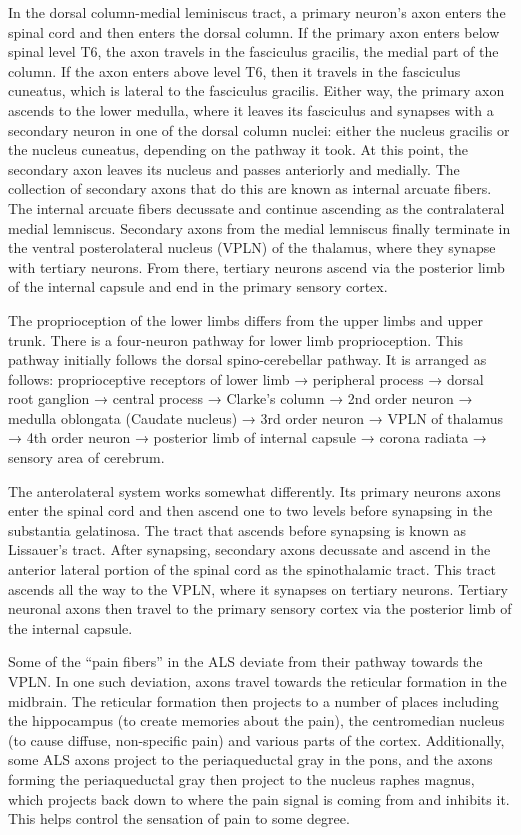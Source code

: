 \documentclass[]{book}
\begin{document}
In the dorsal column-medial leminiscus tract, a primary neuron's axon enters the spinal cord and then enters the dorsal column. If the primary axon enters below spinal level T6, the axon travels in the fasciculus gracilis, the medial part of the column. If the axon enters above level T6, then it travels in the fasciculus cuneatus, which is lateral to the fasciculus gracilis. Either way, the primary axon ascends to the lower medulla, where it leaves its fasciculus and synapses with a secondary neuron in one of the dorsal column nuclei: either the nucleus gracilis or the nucleus cuneatus, depending on the pathway it took. At this point, the secondary axon leaves its nucleus and passes anteriorly and medially. The collection of secondary axons that do this are known as internal arcuate fibers. The internal arcuate fibers decussate and continue ascending as the contralateral medial lemniscus. Secondary axons from the medial lemniscus finally terminate in the ventral posterolateral nucleus (VPLN) of the thalamus, where they synapse with tertiary neurons. From there, tertiary neurons ascend via the posterior limb of the internal capsule and end in the primary sensory cortex.

The proprioception of the lower limbs differs from the upper limbs and upper trunk. There is a four-neuron pathway for lower limb proprioception. This pathway initially follows the dorsal spino-cerebellar pathway. It is arranged as follows: proprioceptive receptors of lower limb → peripheral process → dorsal root ganglion → central process → Clarke's column → 2nd order neuron → medulla oblongata (Caudate nucleus) → 3rd order neuron → VPLN of thalamus → 4th order neuron → posterior limb of internal capsule → corona radiata → sensory area of cerebrum.

The anterolateral system works somewhat differently. Its primary neurons axons enter the spinal cord and then ascend one to two levels before synapsing in the substantia gelatinosa. The tract that ascends before synapsing is known as Lissauer's tract. After synapsing, secondary axons decussate and ascend in the anterior lateral portion of the spinal cord as the spinothalamic tract. This tract ascends all the way to the VPLN, where it synapses on tertiary neurons. Tertiary neuronal axons then travel to the primary sensory cortex via the posterior limb of the internal capsule.

Some of the ``pain fibers'' in the ALS deviate from their pathway towards the VPLN. In one such deviation, axons travel towards the reticular formation in the midbrain. The reticular formation then projects to a number of places including the hippocampus (to create memories about the pain), the centromedian nucleus (to cause diffuse, non-specific pain) and various parts of the cortex. Additionally, some ALS axons project to the periaqueductal gray in the pons, and the axons forming the periaqueductal gray then project to the nucleus raphes magnus, which projects back down to where the pain signal is coming from and inhibits it. This helps control the sensation of pain to some degree.
\end{document}
